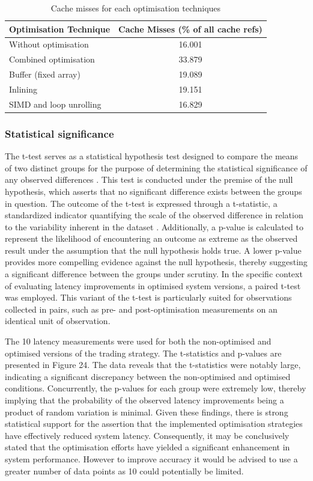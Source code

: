 \documentclass{article}
\theoremstyle{break}
\begin{document}
\begin{table}[htbp]
\centering
\begin{tabular}{lc}
\toprule
\textbf{Optimisation Technique} & \textbf{Cache Misses (\% of all cache refs)} \\
\midrule
Without optimisation & 16.001 \\
Combined optimisation & 33.879 \\
Buffer (fixed array) & 19.089 \\
Inlining & 19.151 \\
SIMD and loop unrolling & 16.829 \\
\bottomrule
\end{tabular}
\caption{Cache misses for each optimisation techniques}
\label{tab:cache_misses}
\end{table}


\subsubsection*{Statistical significance}
The t-test serves as a statistical hypothesis test designed to compare the means of two distinct groups for the purpose of determining the statistical significance of any observed differences \cite{statistics_principles}. This test is conducted under the premise of the null hypothesis, which asserts that no significant difference exists between the groups in question. The outcome of the t-test is expressed through a t-statistic, a standardized indicator quantifying the scale of the observed difference in relation to the variability inherent in the dataset \cite{t_test_handbook}. Additionally, a p-value is calculated to represent the likelihood of encountering an outcome as extreme as the observed result under the assumption that the null hypothesis holds true. A lower p-value provides more compelling evidence against the null hypothesis, thereby suggesting a significant difference between the groups under scrutiny. In the specific context of evaluating latency improvements in optimised system versions, a paired t-test was employed. This variant of the t-test is particularly suited for observations collected in pairs, such as pre- and post-optimisation measurements on an identical unit of observation. 

The 10 latency measurements were used for both the non-optimised and optimised versions of the trading strategy. The t-statistics and p-values are presented in Figure 24. The data reveals that the t-statistics were notably large, indicating a significant discrepancy between the non-optimised and optimised conditions. Concurrently, the p-values for each group were extremely low, thereby implying that the probability of the observed latency improvements being a product of random variation is minimal. Given these findings, there is strong statistical support for the assertion that the implemented optimisation strategies have effectively reduced system latency. Consequently, it may be conclusively stated that the optimisation efforts have yielded a significant enhancement in system performance. However to improve accuracy it would be advised to use a greater number of data points as 10 could potentially be limited.
\end{document}
